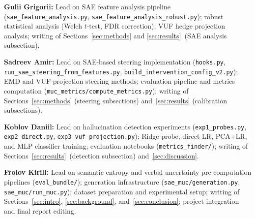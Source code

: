 \documentclass{article}
\begin{document}
\textbf{Gulii Grigorii:} Lead on SAE feature analysis pipeline
(\texttt{sae\_feature\_analysis.py}, \texttt{sae\_feature\_analysis\_robust.py});
robust statistical analysis (Welch $t$-test, FDR correction); VUF hedge
projection analysis; writing of Sections~\ref{sec:methods} and
\ref{sec:results}~(SAE analysis subsection).

\textbf{Sadreev Amir:} Lead on SAE-based steering implementation
(\texttt{hooks.py}, \texttt{run\_sae\_steering\_from\_features.py},
\texttt{build\_intervention\_config\_v2.py}); EMD and VUF-projection steering
methods; evaluation pipeline and metrics computation
(\texttt{muc\_metrics/compute\_metrics.py}); writing of Sections~\ref{sec:methods}
(steering subsections) and~\ref{sec:results} (calibration subsections).

\textbf{Koblov Daniil:} Lead on hallucination detection experiments
(\texttt{exp1\_probes.py}, \texttt{exp2\_direct.py}, \texttt{exp3\_vuf\_projection.py});
Ridge probe, direct LR, PCA+LR, and MLP classifier training;
evaluation notebooks (\texttt{metrics\_finder/}); writing of
Sections~\ref{sec:results}~(detection subsection) and~\ref{sec:discussion}.

\textbf{Frolov Kirill:} Lead on semantic entropy and verbal uncertainty
pre-computation pipelines (\texttt{eval\_bundle/}); generation infrastructure
(\texttt{sae\_muc/generation.py}, \texttt{sae\_muc/run\_muc.py}); dataset preparation
and experimental setup; writing of Sections~\ref{sec:intro},
\ref{sec:background}, and~\ref{sec:conclusion}; project integration and
final report editing.
\end{document}
